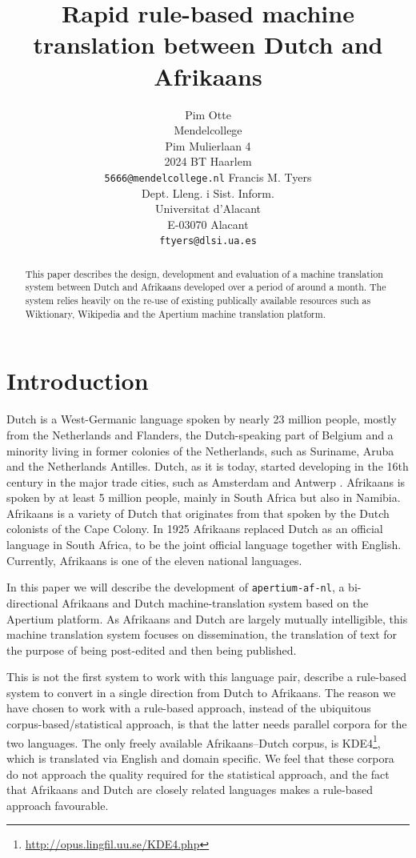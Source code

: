 \documentclass[11pt]{article}
\title{Rapid rule-based machine translation between Dutch and Afrikaans}
\author{Pim Otte\\
  Mendelcollege\\
  Pim Mulierlaan 4\\
  2024 BT Haarlem\\
  {\tt 5666@mendelcollege.nl}  \And
  Francis M. Tyers\\
  Dept. Lleng. i Sist. Inform.\\
  Universitat d'Alacant\\
  E-03070 Alacant \\
  {\tt ftyers@dlsi.ua.es}}
\date{}
\begin{document}
\maketitle
\begin{abstract}
 This paper describes the design, development and evaluation of a machine
 translation system between Dutch and Afrikaans developed over a period of
 around a month. The system relies heavily on the re-use of existing 
 publically available resources such as Wiktionary, Wikipedia and the 
 Apertium machine translation platform.
\end{abstract}

\section{Introduction}

Dutch is a West-Germanic language spoken by nearly 23 million people, 
mostly from the Netherlands and Flanders, the Dutch-speaking part of Belgium and a minority 
living in former colonies of the Netherlands, such as Suriname, Aruba and the Netherlands 
Antilles. Dutch, as it is today, started developing in the 16th century in the 
major trade cities, such as Amsterdam and Antwerp \cite{Shetter:02}.  Afrikaans is spoken 
by at least 5 million people, mainly in South Africa but also in Namibia. Afrikaans is a 
variety of Dutch that originates from that spoken by the Dutch colonists of 
the Cape Colony. In 1925 Afrikaans replaced Dutch as an official language in South Africa, to 
be the joint official language together with English. \cite{Donaldson:93} Currently, Afrikaans is one of the 
eleven national languages. 

In this paper we will describe the development of {\small {\tt apertium-af-nl}}, a bi-directional Afrikaans 
and Dutch machine-translation system based on the Apertium platform. As Afrikaans and Dutch 
are largely mutually intelligible, this machine translation system focuses on dissemination, the 
translation of text for the purpose of being post-edited and then being published. 

This is not the first system to work with this language pair,  describe
a rule-based system to convert in a single direction from Dutch to Afrikaans. 
The reason we have chosen to work with a rule-based approach, instead of the ubiquitous 
corpus-based/statistical approach, is that the latter needs parallel corpora for the two 
languages. The only freely available Afrikaans--Dutch corpus, is 
KDE4\footnote{\url{http://opus.lingfil.uu.se/KDE4.php}}, which is translated via English and 
domain specific. We feel that these corpora do not approach the quality required for the
statistical approach, and the fact that Afrikaans and Dutch are closely related languages 
makes a rule-based approach favourable.
\end{document}
